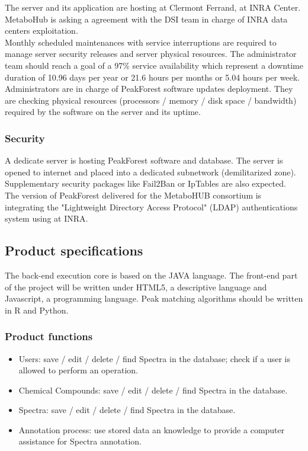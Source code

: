 The server and its application are hosting at Clermont Ferrand, at INRA Center. MetaboHub is asking a agreement with the DSI team in charge of INRA data centers exploitation.\\

Monthly scheduled maintenances with service interruptions are required to manage server security releases and server physical resources. The administrator team should reach a goal of a 97\% service availability which represent a downtime duration of 10.96 days per year or 21.6 hours per months or 5.04 hours per week.\\
 
Administrators are in charge of PeakForest software updates deployment. They are checking physical resources (processors / memory / disk space / bandwidth) required by the software on the server and its uptime.


\subsubsection{Security}
A dedicate server is hosting PeakForest software and database. The server is opened to internet and placed into a dedicated subnetwork (demilitarized zone). Supplementary security packages like Fail2Ban or IpTables are also expected. \\

The version of PeakForest delivered for the MetaboHUB consortium is integrating the "Lightweight Directory Access Protocol" (LDAP) authentications system using at INRA.


\subsection{Product specifications}

The back-end execution core is based on the JAVA language. The front-end part of the project will be written under HTML5, a descriptive language and Javascript, a programming language. Peak matching algorithms should be written in R and Python.


\subsubsection{Product functions}

\begin{itemize}
	\item Users: save / edit / delete / find Spectra in the database; check if a user is allowed to perform an operation.
	\item Chemical Compounds: save / edit / delete / find Spectra in the database.
	\item Spectra: save / edit / delete / find Spectra in the database.
	\item Annotation process: use stored data an knowledge to provide a computer assistance for Spectra annotation.
\end{itemize}


